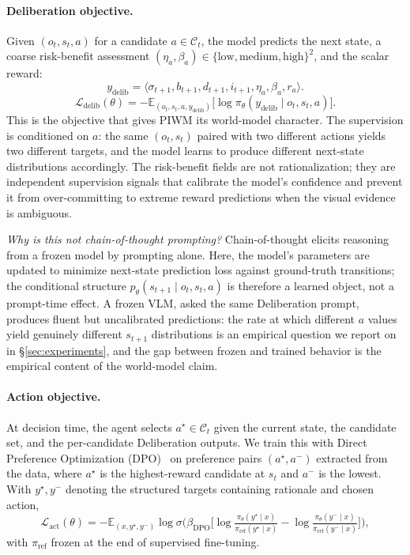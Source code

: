 \documentclass{article}
\begin{document}
\paragraph{Deliberation objective.}
Given $(o_t, s_t, a)$ for a candidate $a \in \mathcal{C}_t$, the model predicts the next state, a coarse risk-benefit assessment $(\eta_a, \beta_a) \in \{\text{low}, \text{medium}, \text{high}\}^2$, and the scalar reward:
\[
y_\text{delib} = \langle \sigma_{t+1}, b_{t+1}, d_{t+1}, i_{t+1}, \eta_a, \beta_a, r_a \rangle.
\]
\[
\mathcal{L}_\text{delib}(\theta) = -\mathbb{E}_{(o_t, s_t, a, y_\text{delib})} \big[ \log \pi_\theta(y_\text{delib} \mid o_t, s_t, a) \big].
\]
This is the objective that gives PIWM its world-model character. The supervision is conditioned on $a$: the same $(o_t, s_t)$ paired with two different actions yields two different targets, and the model learns to produce different next-state distributions accordingly. The risk-benefit fields are not rationalization; they are independent supervision signals that calibrate the model's confidence and prevent it from over-committing to extreme reward predictions when the visual evidence is ambiguous.

\textit{Why is this not chain-of-thought prompting?} Chain-of-thought elicits reasoning from a frozen model by prompting alone. Here, the model's parameters are updated to minimize next-state prediction loss against ground-truth transitions; the conditional structure $p_\theta(s_{t+1} \mid o_t, s_t, a)$ is therefore a learned object, not a prompt-time effect. A frozen VLM, asked the same Deliberation prompt, produces fluent but uncalibrated predictions: the rate at which different $a$ values yield genuinely different $s_{t+1}$ distributions is an empirical question we report on in §\ref{sec:experiments}, and the gap between frozen and trained behavior is the empirical content of the world-model claim.

\paragraph{Action objective.}
At decision time, the agent selects $a^\star \in \mathcal{C}_t$ given the current state, the candidate set, and the per-candidate Deliberation outputs. We train this with Direct Preference Optimization (DPO)~\cite{DPO} on preference pairs $(a^\star, a^-)$ extracted from the data, where $a^\star$ is the highest-reward candidate at $s_t$ and $a^-$ is the lowest. With $y^\star, y^-$ denoting the structured targets containing rationale and chosen action,
\[
\mathcal{L}_\text{act}(\theta) = -\mathbb{E}_{(x, y^\star, y^-)} \log \sigma\!\Big( \beta_\text{DPO} \big[ \log \tfrac{\pi_\theta(y^\star \mid x)}{\pi_\text{ref}(y^\star \mid x)} - \log \tfrac{\pi_\theta(y^- \mid x)}{\pi_\text{ref}(y^- \mid x)} \big] \Big),
\]
with $\pi_\text{ref}$ frozen at the end of supervised fine-tuning.
\end{document}
